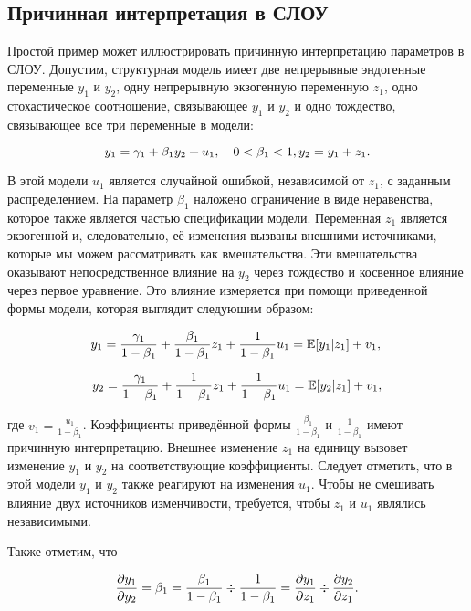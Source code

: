 \subsection{Причинная интерпретация в СЛОУ}


Простой пример может иллюстрировать причинную интерпретацию параметров в СЛОУ. Допустим, структурная модель имеет две непрерывные эндогенные переменные $y_{1}$ и $y_{2}$, одну непрерывную экзогенную переменную $z_{1}$, одно стохастическое соотношение, связывающее $y_{1}$ и $y_{2}$ и одно тождество, связывающее все три переменные в модели:


\[
y_{1}=\gamma_{1}+\beta_{1}y_{2}+u_{1}, \quad 0<\beta_{1}<1, \\
y_{2}=y_{1}+z_{1}.
\]

В этой модели $u_{1}$ является случайной ошибкой, независимой от $z_{1}$, с заданным  распределением. На параметр $\beta_{1}$ наложено ограничение в виде неравенства, которое также является частью спецификации модели. Переменная $z_{1}$ является экзогенной и, следовательно, её изменения вызваны внешними источниками, которые мы можем рассматривать как вмешательства. Эти вмешательства  оказывают непосредственное влияние на $y_{2}$ через тождество и косвенное влияние через первое уравнение. Это влияние измеряется при помощи приведенной формы модели, которая выглядит следующим образом: 

\[
y_{1}=\frac{\gamma_{1}}{1-\beta_{1}}+\frac{\beta_{1}}{1-\beta_{1}}z_{1}+\frac{1}{1-\beta_{1}}u_{1} \\
= \mathbb{E}[y_{1}|z_{1}]+v_{1}, \\
\]

\[
y_{2}=\frac{\gamma_{1}}{1-\beta_{1}}+\frac{1}{1-\beta_{1}}z_{1}+\frac{1}{1-\beta_{1}}u_{1} \\
= \mathbb{E}[y_{2}|z_{1}]+v_{1},
\]

где $v_{1}=\frac{u_{1}}{1-\beta_{1}}$. Коэффициенты приведённой формы $\frac{\beta_{1}}{1-\beta_{1}}$ и $\frac{1}{1-\beta_{1}}$  имеют причинную интерпретацию. Внешнее   изменение $z_{1}$ на единицу вызовет  изменение $y_{1}$ и $y_{2}$ на соответствующие коэффициенты. Следует отметить, что в этой модели $y_{1}$ и $y_{2}$ также реагируют на изменения $u_{1}$. Чтобы не смешивать влияние двух источников изменчивости, требуется, чтобы $z_{1}$ и $u_{1}$ являлись независимыми. 

Также отметим, что

\[
\frac{\partial y_{1}}{\partial y_{2}}=\beta_{1}=\frac{\beta_{1}}{1-\beta_{1}}\div\frac{1}{1-\beta_{1}} \\
=\frac{\partial y_{1}}{\partial z_{1}}\div\frac{\partial y_{2}}{\partial z_{1}}.
\]



